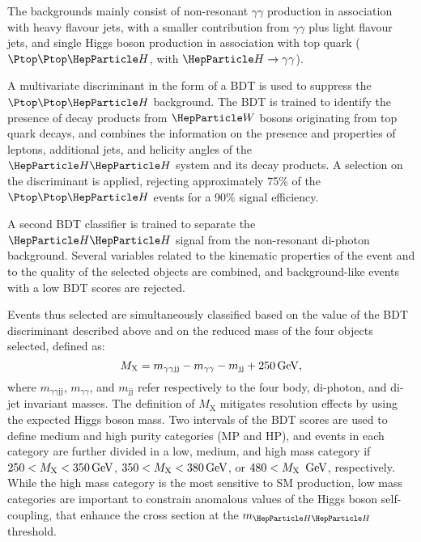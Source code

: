The backgrounds mainly consist of non-resonant $\gamma\gamma$ production in association with heavy flavour jets, with a smaller contribution from $\gamma\gamma$ plus light flavour jets, and single Higgs boson production in association with top quark ($\Ptop\Ptop\PH$, with $\PH\to\gamma\gamma$).

A multivariate discriminant  in the form of a BDT is used to suppress the $\Ptop\Ptop\PH$ background.
The BDT is trained to identify the presence of decay products from $\PW$ bosons originating from top quark decays, and combines the information on the presence and properties of leptons, additional jets, and helicity angles of the $\HH$ system and its decay products.
A selection on the discriminant is applied, rejecting approximately 75\% of the $\Ptop\Ptop\PH$ events for a 90\% signal efficiency.

A second BDT classifier is trained to separate the $\HH$ signal from the non-resonant di-photon background.
Several variables related to the kinematic properties of the event and to the quality of the selected objects are combined, and background-like events with a low BDT scores are rejected.

Events thus selected are simultaneously classified based on the value of the BDT discriminant described above and on the reduced mass of the four objects selected, defined as:
\begin{equation}
    M_\text{X} = m_{\gamma\gamma\text{jj}} - m_{\gamma\gamma} - m_\text{jj} + 250\,\text{Ge\hspace{-.08em}V},
\end{equation}
where $m_{\gamma\gamma\text{jj}}$, $m_{\gamma\gamma}$, and $m_\text{jj}$ refer respectively to the four body, di-photon, and di-jet invariant masses.
The definition of $M_\text{X}$ mitigates resolution effects by using the expected Higgs boson mass.
Two intervals of the BDT scores are used to define medium and high purity categories (MP and HP), and events in each category are further divided in a low, medium, and high mass category if $250 < M_\text{X} < 350\,\text{Ge\hspace{-.08em}V}$, $350 < M_\text{X} < 380\,\text{Ge\hspace{-.08em}V}$, or $480 < M_\text{X}~\,\text{Ge\hspace{-.08em}V}$, respectively.
While the high mass category is the most sensitive to SM \HH production, low mass categories are important to constrain anomalous values of the Higgs boson self-coupling, that enhance the cross section at the $m_{\HH}$ threshold.

